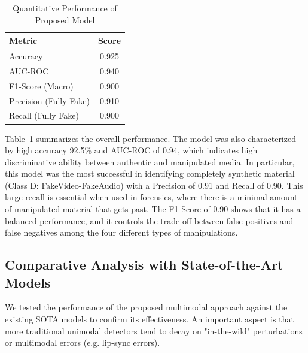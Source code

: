 \documentclass[conference]{IEEEtran}
\begin{document}


\begin{table}[!t]
\caption{Quantitative Performance of Proposed Model}
\centering
\small
\begin{tabular}{l c}
\toprule
\textbf{Metric} & \textbf{Score} \\
\midrule
Accuracy & 0.925 \\
AUC-ROC & 0.940 \\
F1-Score (Macro) & 0.900 \\
Precision (Fully Fake) & 0.910 \\
Recall (Fully Fake) & 0.900 \\
\bottomrule
\end{tabular}
\label{tab:metrics}
\end{table}


Table~\ref{tab:metrics} summarizes the overall performance. The model was also characterized by high accuracy 92.5\% and AUC-ROC of 0.94, which indicates high discriminative ability between authentic and manipulated media. In particular, this model was the most successful in identifying completely synthetic material (Class D: FakeVideo-FakeAudio) with a Precision of 0.91 and Recall of 0.90. This large recall is essential when used in forensics, where there is a minimal amount of manipulated material that gets past. The F1-Score of 0.90 shows that it has a balanced performance, and it controls the trade-off between false positives and false negatives among the four different types of manipulations.

\subsection{Comparative Analysis with State-of-the-Art Models}
We tested the performance of the proposed multimodal approach against the existing SOTA models to confirm its effectiveness. An important aspect is that more traditional unimodal detectors tend to decay on "in-the-wild" perturbations or multimodal errors (e.g. lip-sync errors).
\end{document}
